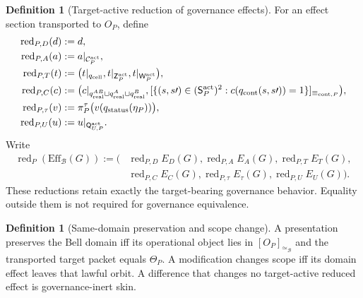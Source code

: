 \documentclass[11pt]{article}
\theoremstyle{definition}
\newtheorem{definition}[theorem]{Definition}
\newcommand{\Bell}{\mathcal{B}}
\newcommand{\BellEq}{\simeq_{\Bell}}
\newcommand{\GovEff}{\mathrm{Eff}_{\Bell}}
\newcommand{\ActRed}{\operatorname{red}_{P}}
\newcommand{\Active}{\mathrm{act}}
\newcommand{\ContEq}{\equiv_{\mathrm{cont},P}}
\begin{document}
\begin{definition}[Target-active reduction of governance effects]\label{def:activereduction}
For an effect section transported to $O_P$, define
\[
\begin{aligned}
\operatorname{red}_{P,D}(d)&:=d,\\
\operatorname{red}_{P,A}(a)&:=a|_{\mathcal C_P^{\Active}},\\
\operatorname{red}_{P,T}(t)&:=\bigl(t|_{q_{\rm cell}},t|_{\mathsf Z_P^{\Active}},t|_{\mathsf W_P^{\Active}}\bigr),\\
\operatorname{red}_{P,C}(c)&:=\bigl(c|_{q^{AB}_{\rm real}\sqcup q^A_{\rm real}\sqcup q^B_{\rm real}},
 [\{(s,s\prime)\in(\mathsf S_P^{\Active})^2:c(q_{\rm cont}(s,s\prime))=1\}]_{\ContEq}\bigr),\\
\operatorname{red}_{P,\tau}(v)&:=\pi_P^{\tau}\bigl(v(q_{\rm status}(\eta_P))\bigr),\\
\operatorname{red}_{P,U}(u)&:=u|_{\mathsf Q_{U,P}^{\Active}}.
\end{aligned}
\]
Write
\[
\begin{aligned}
\ActRed(\GovEff(G)):=(&\operatorname{red}_{P,D}E_D(G),
\operatorname{red}_{P,A}E_A(G),
\operatorname{red}_{P,T}E_T(G),\\
&\operatorname{red}_{P,C}E_C(G),
\operatorname{red}_{P,\tau}E_{\tau}(G),
\operatorname{red}_{P,U}E_U(G)).
\end{aligned}
\]
These reductions retain exactly the target-bearing governance behavior. Equality outside them is not required for governance equivalence.
\end{definition}

\begin{definition}[Same-domain preservation and scope change]\label{def:samedomain}
A presentation preserves the Bell domain iff its operational object lies in $[O_P]_{\BellEq}$ and the transported target packet equals $\Theta_P$. A modification changes scope iff its domain effect leaves that lawful orbit. A difference that changes no target-active reduced effect is governance-inert skin.
\end{definition}
\end{document}
